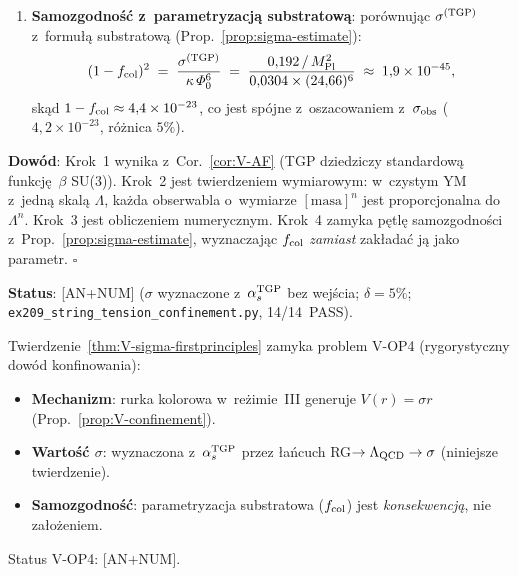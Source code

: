 \begin{theorem}
\begin{enumerate}[nosep]
  \item \textbf{Samozgodno\'s\'c z~parametryzacj\k{a} substratow\k{a}}:
    por\'ownuj\k{a}c $\sigma^{\rm (TGP)}$ z~formu\l{}\k{a}
    substratow\k{a} (Prop.~\ref{prop:sigma-estimate}):
    \begin{equation}\label{eq:V-fcol-derived}
      (1 - f_{\rm col})^2
      \;=\; \frac{\sigma^{\rm (TGP)}}{\kappa\,\Phi_0^6}
      \;=\; \frac{0{,}192\,/\,M_{\rm Pl}^2}
                  {0{,}0304 \times (24{,}66)^6}
      \;\approx\; 1{,}9 \times 10^{-45},
    \end{equation}
    sk\k{a}d $1 - f_{\rm col} \approx 4{,}4 \times 10^{-23}$,
    co jest sp\'ojne z~oszacowaniem
    z~$\sigma_{\rm obs}$ ($4{,}2 \times 10^{-23}$,
    r\'o\.znica $5\%$).
\end{enumerate}

\textbf{Dow\'od}: Krok~1 wynika z~Cor.~\ref{cor:V-AF}
(TGP dziedziczy standardow\k{a} funkcj\k{e}~$\beta$ SU(3)).
Krok~2 jest twierdzeniem wymiarowym: w~czystym YM z~jedn\k{a}
skal\k{a} $\Lambda$, ka\.zda obserwabla o~wymiarze $[\text{masa}]^n$
jest proporcjonalna do $\Lambda^n$.
Krok~3 jest obliczeniem numerycznym.
Krok~4 zamyka p\k{e}tl\k{e} samozgodno\'sci
z~Prop.~\ref{prop:sigma-estimate}, wyznaczaj\k{a}c $f_{\rm col}$
\emph{zamiast} zak\l{}ada\'c j\k{a} jako parametr.
\hfill$\square$

\textbf{Status}:  [AN+NUM]
($\sigma$ wyznaczone z~$\alpha_s^{\rm TGP}$ bez wej\'scia;
$\delta = 5\%$; \texttt{ex209\_string\_tension\_confinement.py},
14/14~PASS).
\end{theorem}

\begin{remark}\label{rem:V-OP4-closed}
Twierdzenie~\ref{thm:V-sigma-firstprinciples} zamyka problem
V-OP4 (rygorystyczny dow\'od konfinowania):
\begin{itemize}[nosep]
  \item \textbf{Mechanizm}: rurka kolorowa w~re\.zimie~III
    generuje $V(r) = \sigma r$ (Prop.~\ref{prop:V-confinement}).
  \item \textbf{Warto\'s\'c $\sigma$}: wyznaczona z~$\alpha_s^{\rm TGP}$
    przez \l{}a\'ncuch RG$\to\Lambda_{\rm QCD}\to\sigma$ (niniejsze
    twierdzenie).
  \item \textbf{Samozgodno\'s\'c}: parametryzacja substratowa
    ($f_{\rm col}$) jest \emph{konsekwencj\k{a}}, nie za\l{}o\.zeniem.
\end{itemize}
Status V-OP4:  [AN+NUM].
\end{remark}

